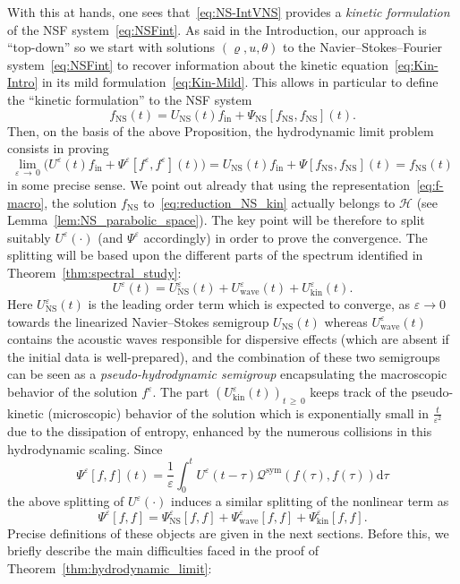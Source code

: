 \documentclass[AHL,Unicode,longabstracts,published]{cedram}
\newcommand{\ini}{\mathrm{in}}
\newcommand{\ns}{\mathrm{NS}}
\newcommand{\kin}{\mathrm{kin}}
\newcommand{\sym}{\mathrm{sym}}
\renewcommand{\d}{\mathrm{d}}
\newcommand{\Wave}{\mathrm{wave}}
\newcommand{\QQ}{\mathcal{Q}}
\newcommand{\HHH}{\mathscr{H}}
\newcommand{\SSSs}{\HHH}
\renewcommand*\ge{\geqslant}
\newcommand*\eps{{\varepsilon}}
\begin{document}
With this at hands, one sees that~\eqref{eq:NS-IntVNS} provides a \emph{kinetic formulation} of the NSF system~\eqref{eq:NSFint}. As said in the Introduction, our approach is ``top-down'' so we start with solutions $(\varrho,u,\theta)$ to the Navier--Stokes--Fourier system~\eqref{eq:NSFint} to recover information about the kinetic equation~\eqref{eq:Kin-Intro} in its mild formulation~\eqref{eq:Kin-Mild}. This allows in particular to define the ``kinetic formulation'' to the NSF system
\begin{equation}\label{eq:reduction_NS_kin}
f_\ns(t)=U_\ns(t)f_\ini + \Psi_\ns\left[f_\ns,f_\ns\right](t).
\end{equation}
Then, on the basis of the above Proposition, the hydrodynamic limit problem consists in proving
\[
\lim_{\eps\,\to\,0}\Big(U^\eps(t) f_\ini + \Psi^\eps\left[f^\eps, f^\eps \right](t) \Big)= U_\ns(t) f_\ini + \Psi[f_\ns, f_\ns](t) = f_\ns(t)
\]
in some precise sense. We point out already that using the representation~\eqref{eq:f-macro}, the solution $f_\ns$ to~\eqref{eq:reduction_NS_kin} actually belongs to $\SSSs$ (see Lemma~\ref{lem:NS_parabolic_space}).\color{black} The key point will be therefore to split suitably $U^\eps(\cdot)$ (and $\Psi^\eps$ accordingly) in order to prove the convergence. The splitting will be based upon the different parts of the spectrum identified in Theorem~\ref{thm:spectral_study}:
\[
U^\eps(t)=U^\eps_\ns(t)+U^\eps_\Wave(t)+U^\eps_\kin(t).
\]
Here $U^\eps_\ns(t)$ is the leading order term which is expected to converge, as $\eps\to0$ towards the linearized Navier--Stokes semigroup $U_\ns(t)$ whereas $U^\eps_\Wave(t)$ contains the acoustic waves {responsible for dispersive effects (which are absent if the initial data is well-prepared)}, and the combination of these two semigroups can be seen as a \emph{pseudo-hydrodynamic semigroup} encapsulating the macroscopic behavior of the solution $f^\eps$. The part $(U^\eps_\kin(t))_{t\,\ge\,0}$ keeps track of the {pseudo-}kinetic (microscopic) behavior of the solution which is exponentially small in $\frac{t}{\eps^2}$ due to the dissipation of entropy, enhanced by the numerous collisions in this hydrodynamic scaling. Since
\[
\Psi^\eps[f,f](t)=\frac{1}{\eps}\int_0^t U^\eps(t-\tau)\QQ^{\sym}(f(\tau),f(\tau))\d\tau
\]
the above splitting of $U^\eps(\cdot)$ induces a similar splitting of the nonlinear term as
\[
\Psi^\eps[f,f]=\Psi^\eps_\ns[f,f]+\Psi^\eps_\Wave[f,f]+\Psi^\eps_\kin[f,f].
\]
Precise definitions of these objects are given in the next sections. Before this, we briefly describe the main difficulties faced in the proof of Theorem~\ref{thm:hydrodynamic_limit}:
\end{document}
